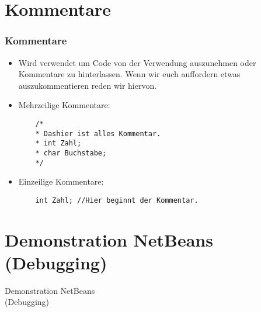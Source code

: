 \documentclass[final]{beamer}
\begin{document}
\section{Kommentare}
\begin{frame}[fragile]
	\frametitle{Kommentare}
	\begin{itemize}
	\item Wird verwendet um Code von der Verwendung auszunehmen oder Kommentare zu hinterlassen. Wenn wir euch auffordern etwas auszukommentieren reden wir hiervon.
	\item Mehrzeilige Kommentare:
	\begin{lstlisting}
	/*
	* Dashier ist alles Kommentar.	
	* int Zahl;
	* char Buchstabe;	
	*/
	\end{lstlisting}
	\item Einzeilige Kommentare:
	\begin{lstlisting}
	int Zahl; //Hier beginnt der Kommentar.
	\end{lstlisting}
	\end{itemize}
\end{frame}

\section{Demonstration NetBeans (Debugging)}
\begin{frame}[fragile]
  \begin{center}
    \Huge{Demonstration NetBeans \\ (Debugging)}
  \end{center}
\end{frame}
\end{document}
